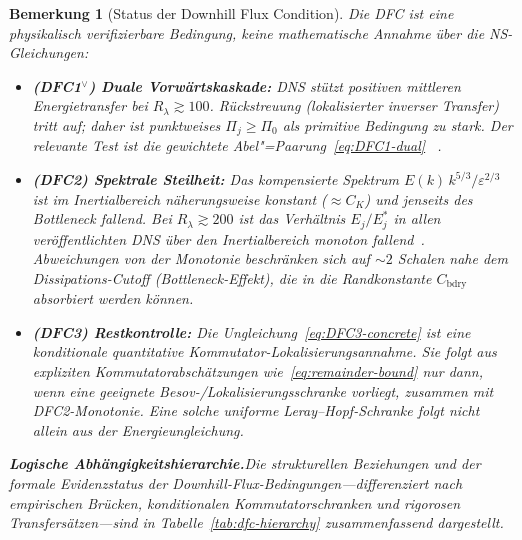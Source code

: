 \documentclass[12pt,a4paper]{article}
\theoremstyle{breakdef}
\theoremstyle{breakplain}
\theoremstyle{breakdef}
\newtheorem{remark}[definition]{Bemerkung}
\begin{document}
\begin{remark}[Status der Downhill Flux Condition]
\label{rem:DFC-status}
Die DFC ist eine \emph{physikalisch verifizierbare} Bedingung, keine
mathematische Annahme über die NS-Gleichungen:
\begin{itemize}
  \item \textbf{(DFC1$^\vee$) Duale Vorwärtskaskade:} DNS stützt
    positiven mittleren Energietransfer bei $R_\lambda \gtrsim 100$.
    Rückstreuung (lokalisierter inverser Transfer) tritt auf; daher ist
    punktweises $\Pi_j\ge\Pi_0$ als primitive Bedingung zu stark. Der
    relevante Test ist die gewichtete Abel"=Paarung~\eqref{eq:DFC1-dual}
    ~\cite{Frisch95,ES06,Kaneda03,Gotoh02}.
  \item \textbf{(DFC2) Spektrale Steilheit:} Das kompensierte Spektrum
    $E(k)\,k^{5/3}/\varepsilon^{2/3}$ ist im Inertialbereich
    näherungsweise konstant ($\approx C_K$) und jenseits des
    Bottleneck \emph{fallend}. Bei $R_\lambda \gtrsim 200$ ist das
    Verhältnis $E_j/E_j^*$ in allen veröffentlichten DNS über den
    Inertialbereich monoton fallend~\cite{ES06,Frisch95}. Abweichungen
    von der Monotonie beschränken sich auf $\sim 2$ Schalen nahe dem
    Dissipations-Cutoff (Bottleneck-Effekt), die in die Randkonstante
    $C_{\mathrm{bdry}}$ absorbiert werden können.
  \item \textbf{(DFC3) Restkontrolle:} Die
    Ungleichung~\eqref{eq:DFC3-concrete} ist eine konditionale quantitative
    Kommutator-Lokalisierungsannahme. Sie folgt aus expliziten
    Kommutatorabschätzungen wie~\eqref{eq:remainder-bound} nur dann, wenn
    eine geeignete Besov-/Lokalisierungsschranke vorliegt, zusammen mit
    DFC2-Monotonie. Eine solche uniforme Leray--Hopf-Schranke folgt nicht
    allein aus der Energieungleichung.
\end{itemize}

\medskip\noindent
\textbf{Logische Abhängigkeitshierarchie.}\quad Die strukturellen Beziehungen und der formale Evidenzstatus der Downhill-Flux-Bedingungen---differenziert nach empirischen Brücken, konditionalen Kommutatorschranken und rigorosen Transfersätzen---sind in Tabelle~\ref{tab:dfc-hierarchy} zusammenfassend dargestellt.
\medskip


\end{remark}
\end{document}
